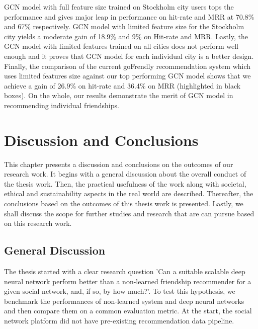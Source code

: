 \documentclass{kththesis}
\begin{document}
GCN model with full feature size trained on Stockholm city users tops the performance and gives major leap in performance on hit-rate and MRR at 70.8\% and 67\% respectively. GCN model with limited feature size for the Stockholm city yields a moderate gain of 18.9\% and 9\% on Hit-rate and MRR. Lastly, the GCN model with limited features trained on all cities does not perform well enough and it proves that GCN model for each individual city is a better design. Finally, the comparison of the current goFrendly recommendation system which uses limited features size against our top performing GCN model shows that we achieve a gain of 26.9\% on hit-rate and 36.4\% on MRR (highlighted in black boxes). On the whole, our results demonstrate the merit of GCN model in recommending individual friendships. \\


\chapter{Discussion and Conclusions}
This chapter presents a discussion and conclusions on the outcomes of our research work. It begins with a general discussion about the overall conduct of the thesis work. Then, the practical usefulness of the work along with societal, ethical and sustainability aspects in the real world are described. Thereafter, the conclusions based on the outcomes of this thesis work is presented. Lastly, we shall discuss the scope for further studies and research that are can pursue based on this research work.

\section{General Discussion}
The thesis started with a clear research question 'Can a suitable scalable deep neural network perform better than a non-learned friendship recommender for a given social network, and, if so, by how much?'. To test this hypothesis, we benchmark the performances of non-learned system and deep neural networks and then compare them on a common evaluation metric. At the start, the social network platform did not have pre-existing recommendation data pipeline. \\
\end{document}
